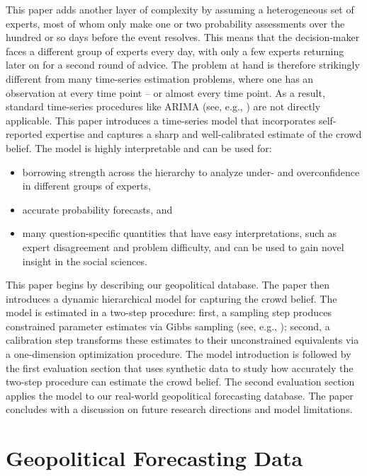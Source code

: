 \documentclass[aoas, preprint]{imsart}
\numberwithin{equation}{section}
\theoremstyle{plain}
\begin{document}
This paper adds another layer of complexity by assuming a heterogeneous set of experts, most of whom only make one or two probability assessments over the hundred or so days before the event resolves. This means that the decision-maker faces a different group of experts  every day, with only a few experts returning later on for a second round of advice. The problem at hand is therefore strikingly different from many time-series estimation problems, where one has an observation at every time point -- or almost every time point. As a result, standard time-series procedures like ARIMA (see, e.g., \citet{mills1991time}) are not directly applicable. This paper introduces a time-series model that incorporates self-reported expertise and captures a sharp and well-calibrated estimate of the crowd belief. The model is highly interpretable and can be used for:
\begin{itemize}
\item borrowing strength across the hierarchy to analyze under- and overconfidence in different groups of experts,
\item accurate probability forecasts, and
\item many question-specific quantities that have easy interpretations, such as expert disagreement and problem difficulty, and can be used to gain novel insight in the social sciences. 
\end{itemize}

This paper begins by describing our geopolitical database. The paper then introduces a dynamic hierarchical model for capturing the crowd belief. The model is estimated in a two-step procedure: first, a sampling step produces constrained parameter estimates via Gibbs sampling (see, e.g., \citet{geman1984stochastic}); second, a calibration step transforms these estimates to their unconstrained equivalents via a one-dimension optimization procedure. The model introduction is followed by the first evaluation section that uses synthetic data to study how accurately the two-step procedure can estimate the crowd belief. The second evaluation section applies the model to our real-world geopolitical forecasting database. The paper concludes with a discussion on future research directions and model limitations.

\section{Geopolitical Forecasting Data}
\label{data}
\end{document}
